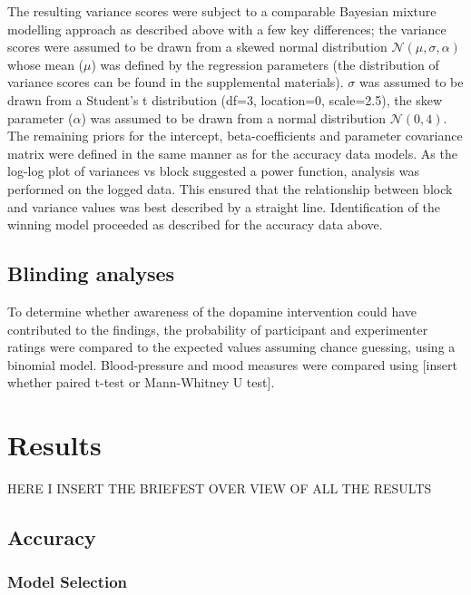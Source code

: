 \documentclass{article}
\begin{document}
The resulting variance scores were subject to a comparable Bayesian
mixture modelling approach as described above with a few key
differences; the variance scores were assumed to be drawn from a skewed
normal distribution \(\mathcal{N}(\mu, \sigma, \alpha)\) whose mean
(\(\mu\)) was defined by the regression parameters (the distribution of
variance scores can be found in the supplemental materials). \(\sigma\)
was assumed to be drawn from a Student's t distribution (df=3,
location=0, scale=2.5), the skew parameter (\(\alpha\)) was assumed to
be drawn from a normal distribution \(\mathcal{N}(0,4)\). The remaining
priors for the intercept, beta-coefficients and parameter covariance
matrix were defined in the same manner as for the accuracy data models.
As the log-log plot of variances vs block suggested a power function,
analysis was performed on the logged data. This ensured that the
relationship between block and variance values was best described by a
straight line. Identification of the winning model proceeded as
described for the accuracy data above.

\hypertarget{blinding-analyses}{%
\subsection{Blinding analyses}\label{blinding-analyses}}

To determine whether awareness of the dopamine intervention could have
contributed to the findings, the probability of participant and
experimenter ratings were compared to the expected values assuming
chance guessing, using a binomial model. Blood-pressure and mood
measures were compared using {[}insert whether paired t-test or
Mann-Whitney U test{]}.

\hypertarget{results}{%
\section{Results}\label{results}}

HERE I INSERT THE BRIEFEST OVER VIEW OF ALL THE RESULTS

\hypertarget{accuracy-1}{%
\subsection{Accuracy}\label{accuracy-1}}

\hypertarget{model-selection}{%
\subsubsection{Model Selection}\label{model-selection}}
\end{document}
